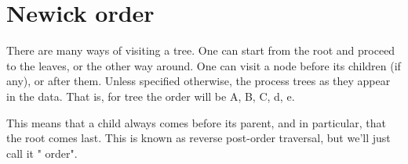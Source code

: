 
\chapter[newick_order]{Newick order}


There are many ways of visiting a tree. One can start from the root and
proceed to the leaves, or the other way around. One can visit a node before
its children (if any), or after them. Unless specified otherwise, the
\nutils{} process trees as they appear in the \nw{} data. That is, for
tree  the order will be A, B, C, d, e.

This means that a child always comes before its parent, and in particular,
that the root comes last. This is known as reverse post-order traversal, but
we'll just call it "\nw{} order".
